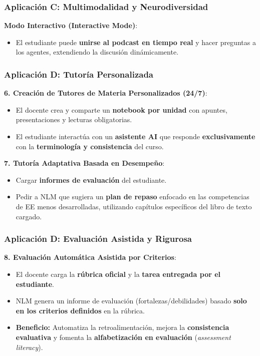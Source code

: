 \documentclass[aspectratio=43]{beamer}
\begin{document}
\begin{frame}
\frametitle{ Aplicación C: Multimodalidad y Neurodiversidad}

\textbf{Modo Interactivo (Interactive Mode)}:
\begin{itemize}
    \item El estudiante puede \textbf{unirse al podcast en tiempo real} y hacer preguntas a los agentes, extendiendo la discusión dinámicamente.
\end{itemize}
\end{frame}

\begin{frame}
\frametitle{ Aplicación D: Tutoría Personalizada}

\textbf{6. Creación de Tutores de Materia Personalizados (24/7)}:
\begin{itemize}
    \item El docente crea y comparte un \textbf{notebook por unidad} con apuntes, presentaciones y lecturas obligatorias.
    \item El estudiante interactúa con un \textbf{asistente AI} que responde \textbf{exclusivamente} con la \textbf{terminología y consistencia} del curso.
\end{itemize}

\textbf{7. Tutoría Adaptativa Basada en Desempeño}:
\begin{itemize}
    \item Cargar \textbf{informes de evaluación} del estudiante.
    \item Pedir a NLM que sugiera un \textbf{plan de repaso} enfocado en las competencias de EE menos desarrolladas, utilizando capítulos específicos del libro de texto cargado.
\end{itemize}
\end{frame}

\begin{frame}
\frametitle{ Aplicación D: Evaluación Asistida y Rigurosa}

\textbf{8. Evaluación Automática Asistida por Criterios}:
\begin{itemize}
    \item El docente carga la \textbf{rúbrica oficial} y la \textbf{tarea entregada por el estudiante}.
    \item NLM genera un informe de evaluación (fortalezas/debilidades) basado \textbf{solo en los criterios definidos} en la rúbrica.
    \item \textbf{Beneficio:} Automatiza la retroalimentación, mejora la \textbf{consistencia evaluativa} y fomenta la \textbf{alfabetización en evaluación} (\textit{assessment literacy}).
\end{itemize}

\end{frame}
\end{document}
